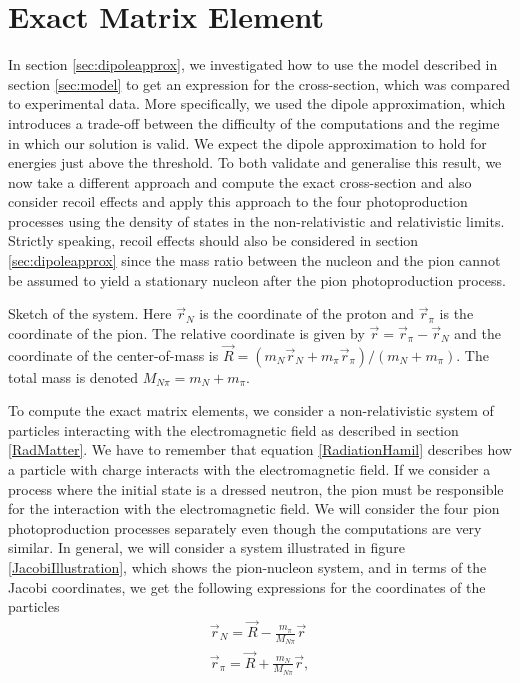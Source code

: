 \section{Exact Matrix Element}\label{sec:exact}
In section \ref{sec:dipoleapprox}, we investigated how to use the model described in section \ref{sec:model} to get an expression for the cross-section, which was compared to experimental data. More specifically, we used the dipole approximation, which introduces a trade-off between the difficulty of the computations and the regime in which our solution is valid. We expect the dipole approximation to hold for energies just above the threshold. To both validate and generalise this result, we now take a different approach and compute the exact cross-section and also consider recoil effects and apply this approach to the four photoproduction processes using the density of states in the non-relativistic and relativistic limits. Strictly speaking, recoil effects should also be considered in section \ref{sec:dipoleapprox} since the mass ratio between the nucleon and the pion cannot be assumed to yield a stationary nucleon after the pion photoproduction process.  
\begin{marginfigure}
	\centering
	
	\caption{Sketch of the system. Here $\vec{r}_N$ is the coordinate of the proton and $\vec{r}_\pi$ is the coordinate of the pion. The relative coordinate is given by $\vec{r}=\vec{r}_\pi-\vec{r}_N$ and the coordinate of the center-of-mass is $\vec{R}=(m_N \vec{r}_N+m_\pi\vec{r}_\pi)/(m_N+m_\pi)$. The total mass is denoted $M_{N\pi}=m_N+m_\pi$.}
	\label{JacobiIllustration}
\end{marginfigure}
To compute the exact matrix elements, we consider a non-relativistic system of particles interacting with the electromagnetic field as described in section \ref{RadMatter}. We have to remember that equation \eqref{RadiationHamil} describes how a particle with charge interacts with the electromagnetic field. If we consider a process where the initial state is a dressed neutron, the pion must be responsible for the interaction with the electromagnetic field. We will consider the four pion photoproduction processes separately even though the computations are very similar. In general, we will consider a system illustrated in figure \ref{JacobiIllustration}, which shows the pion-nucleon system, and in terms of the Jacobi coordinates, we get the following expressions for the coordinates of the particles
\begin{align} \label{Coordinates}
	\vec{r}_N = \vec{R}-\frac{m_\pi}{M_{N\pi}}\vec{r} \\
	\vec{r}_\pi = \vec{R}+\frac{m_N}{M_{N\pi}}\vec{r},
\end{align}
